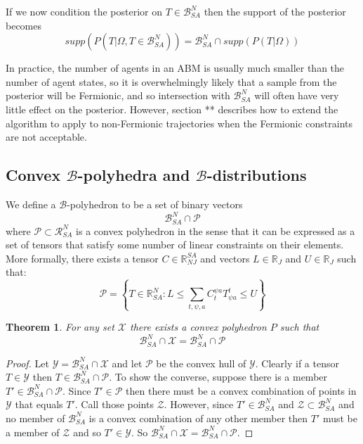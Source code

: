 \documentclass{article}
\newtheorem{theorem}{Theorem}
\begin{document}
If we now condition the posterior on $T \in \mathcal{B}^N_{SA}$ then the support of the posterior becomes
\begin{equation}
supp(P(T|\Omega, T\in\mathcal{B}^N_{SA})) = \mathcal{B}^N_{SA} \cap supp(P(T|\Omega))
\label{fermionicSupport1}
\end{equation}

In practice, the number of agents in an ABM is usually much smaller than the number of agent states, so it is overwhelmingly likely that a sample from the posterior will be Fermionic, and so intersection with $\mathcal{B}^N_{SA}$ will often have very little effect on the posterior. However, section ** describes how to extend the algorithm to apply to non-Fermionic trajectories when the Fermionic constraints are not acceptable.

\subsection{Convex $\mathcal{B}$-polyhedra and $\mathcal{B}$-distributions}
\label{BPoly}


We define a $\mathcal{B}$-polyhedron to be a set of binary vectors
\[
\mathcal{B}^N_{SA} \cap \mathcal{P}
\]
where $\mathcal{P} \subset \mathcal{R}^N_{SA}$ is a convex polyhedron in the sense that it can be expressed as a set of tensors that satisfy some number of linear constraints on their elements. More formally, there exists a tensor $C \in \mathbb{R}^{SA}_{NJ}$ and vectors $L \in \mathbb{R}_J$ and $U \in \mathbb{R}_J$ such that:
\[
\mathcal{P} = \left\{ T\in\mathbb{R}^N_{SA} : L \le \sum_{t,\psi,a} C^{\psi a}_{t} T^t_{\psi a} \le U \right\}
\]

\begin{theorem}
For any set $\mathcal{X}$ there exists a convex polyhedron $P$ such that
\[
\mathcal{B}^N_{SA} \cap \mathcal{X} = \mathcal{B}^N_{SA} \cap \mathcal{P}
\]
\end{theorem}
\begin{proof}
Let $\mathcal{Y} = \mathcal{B}^N_{SA} \cap \mathcal{X}$ and let $\mathcal{P}$ be the convex hull of $\mathcal{Y}$. Clearly if a tensor $T\in \mathcal{Y}$ then $T\in \mathcal{B}^N_{SA} \cap \mathcal{P}$. To show the converse, suppose there is a member $T' \in \mathcal{B}^N_{SA} \cap \mathcal{P}$. Since $T'\in \mathcal{P}$ then there must be a convex combination of points in $\mathcal{Y}$ that equals $T'$. Call those points $\mathcal{Z}$. However, since $T' \in \mathcal{B}^N_{SA}$ and $\mathcal{Z}\subset \mathcal{B}^N_{SA}$ and no member of $\mathcal{B}^N_{SA}$ is a convex combination of any other member then $T'$ must be a member of $\mathcal{Z}$ and so $T'\in \mathcal{Y}$. So $\mathcal{B}^N_{SA} \cap \mathcal{X} = \mathcal{B}^N_{SA} \cap \mathcal{P}$. 
\end{proof}
\end{document}
